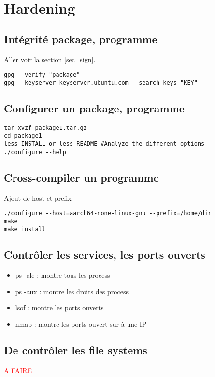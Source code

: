 \documentclass[resume]{subfiles}
\begin{document}
\section{Hardening}

\subsection{Intégrité package, programme}
Aller voir la section \ref{sec_sign}.
\begin{lstlisting}[style=console]
gpg --verify "package"
gpg --keyserver keyserver.ubuntu.com --search-keys "KEY"
\end{lstlisting}

\subsection{Configurer un package, programme}
\begin{lstlisting}[style=console]
tar xvzf package1.tar.gz
cd package1
less INSTALL or less README #Analyze the different options
./configure --help
\end{lstlisting}

\subsection{Cross-compiler un programme}
Ajout de host et prefix
\begin{lstlisting}[style=console]
./configure --host=aarch64-none-linux-gnu --prefix=/home/dir
make 
make install
\end{lstlisting}

\subsection{Contrôler les services, les ports ouverts}
\begin{itemize}
\item ps -ale : montre tous les process
\item ps -aux : montre les droits des process
\item lsof    : montre les ports ouverts
\item nmap    : montre les ports ouvert sur à une IP

\end{itemize}


\subsection{De contrôler les file systems}
\textcolor{red}{A FAIRE}
\end{document}
